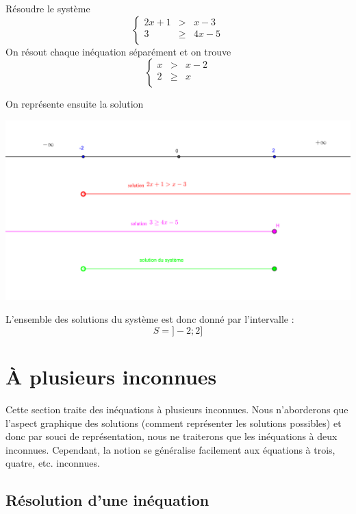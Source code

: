 \begin{exemple}

Résoudre le système 
$$
\left\{
\begin{array}{lcl}
2x+1&>&x-3\\
3&\geq & 4x-5\\ 
\end{array}
\right.
$$
On résout chaque inéquation séparément et on trouve
$$
\left\{
\begin{array}{lcl}
x&>&x-2\\
2&\geq & x\\ 
\end{array}
\right.
$$

On représente ensuite la solution
\begin{center}
\includegraphics[width = 0.9 \textwidth]{inequation1/inequations1.png}
\end{center}
\end{exemple}

L'ensemble des solutions du système est donc donné par l'intervalle :
$$
S=]-2;2]
$$

\section{À plusieurs inconnues}

Cette section traite des inéquations à plusieurs inconnues. Nous n'aborderons que l'aspect graphique des solutions (comment représenter les solutions possibles) et donc par souci de représentation, nous ne traiterons que les inéquations à deux inconnues. Cependant, la notion se généralise facilement aux équations à trois, quatre, etc. inconnues.

\subsection{Résolution d'une inéquation}

